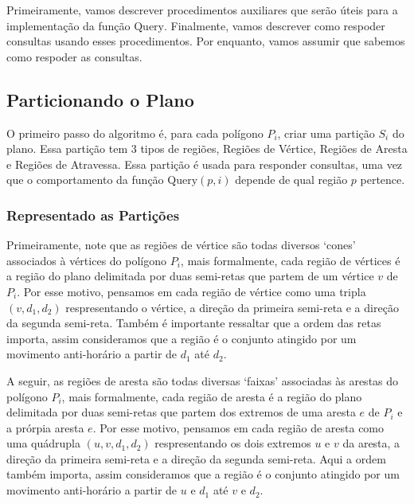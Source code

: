 \documentclass{article}
\begin{document}
Primeiramente, vamos descrever procedimentos auxiliares que serão úteis para a implementação da função \(\text{Query}\). Finalmente, vamos descrever como respoder consultas usando esses procedimentos. Por enquanto, vamos assumir que sabemos como respoder as consultas.

\subsection{Particionando o Plano}

O primeiro passo do algoritmo é, para cada polígono \(P_i\), criar uma partição \(S_i\) do plano. Essa partição tem 3 tipos de regiões, 
\textcolor[RGB]{255, 70, 70}{Regiões de Vértice}, \textcolor[RGB]{86, 179, 86}{Regiões de Aresta} e \textcolor[RGB]{76, 146, 195}{Regiões de Atravessa}.
Essa partição é usada para responder consultas, uma vez que o comportamento da função \(\text{Query}(p, i)\) depende de qual região \(p\) pertence.

\subsubsection{Representado as Partições}

Primeiramente, note que as regiões de vértice são todas diversos `cones' associados à vértices do polígono \(P_i\), mais formalmente, cada região de vértices é a região do plano delimitada por duas semi-retas que partem de um vértice \(v\) de \(P_i\). Por esse motivo, pensamos em cada região de vértice como uma tripla \((v, d_1, d_2)\) respresentando o vértice, a direção da primeira semi-reta e a direção da segunda semi-reta. Também é importante ressaltar que a ordem das retas importa, assim consideramos que a região é o conjunto atingido por um movimento anti-horário a partir de \(d_1\) até \(d_2\).

A seguir, as regiões de aresta são todas diversas `faixas' associadas às arestas do polígono \(P_i\), mais formalmente, cada região de aresta é a região do plano delimitada por duas semi-retas que partem dos extremos de uma aresta \(e\) de \(P_i\) e a prórpia aresta \(e\). Por esse motivo, pensamos em cada região de aresta como uma quádrupla \((u, v, d_1, d_2)\) respresentando os dois extremos \(u\) e \(v\) da aresta, a direção da primeira semi-reta e a direção da segunda semi-reta. Aqui a ordem também importa, assim consideramos que a região é o conjunto atingido por um movimento anti-horário a partir de \(u\) e \(d_1\) até \(v\) e \(d_2\).
\end{document}
